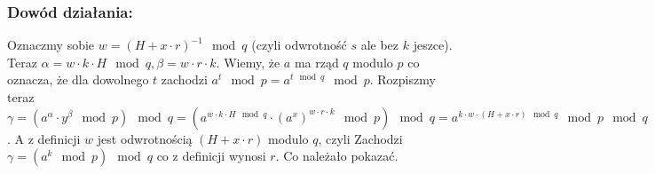 \subsubsection{Dowód działania:}
Oznaczmy sobie $w = (H + x\cdot r)^{-1} \mod q$ (czyli odwrotność $s$ ale bez $k$ jeszce). Teraz $\alpha = w\cdot k\cdot H \mod q, \beta = w\cdot r \cdot k$. Wiemy, że $a$ ma rząd $q$ modulo $p$ co oznacza, że dla dowolnego $t$ zachodzi $a^t \mod p = a^{t \mod q} \mod p$. Rozpiszmy teraz $\gamma = (a^{\alpha}\cdot y^{\beta} \mod p) \mod q = (a^{w\cdot k\cdot H \mod q} \cdot (a^{x})^{w\cdot r \cdot k} \mod p) \mod q  = a^{k\cdot w \cdot (H + x\cdot r) \mod q}\mod p \mod q$. A z definicji $w$ jest odwrotnością $(H + x\cdot r)$ modulo $q$, czyli Zachodzi $\gamma = (a^k \mod p) \mod q$ co z definicji wynosi $r$. Co należało pokazać.